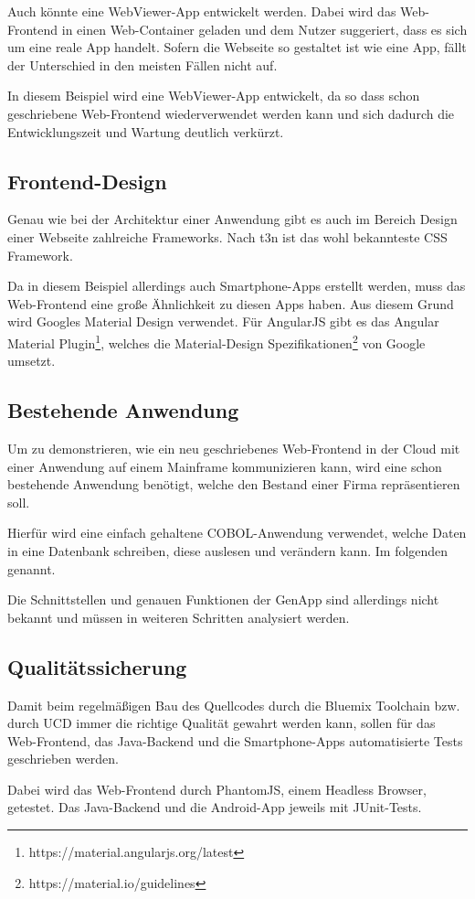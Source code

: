 Auch könnte eine WebViewer-App entwickelt werden. Dabei wird das Web-Frontend in einen Web-Container geladen und dem
Nutzer suggeriert, dass es sich um eine reale App handelt. Sofern die Webseite so gestaltet ist wie eine App, fällt der
Unterschied in den meisten Fällen nicht auf.

In diesem Beispiel wird eine WebViewer-App entwickelt, da so dass schon geschriebene Web-Frontend wiederverwendet werden
kann und sich dadurch die Entwicklungszeit und Wartung deutlich verkürzt.

\subsection{Frontend-Design}
Genau wie bei der Architektur einer Anwendung gibt es auch im Bereich Design einer Webseite zahlreiche Frameworks. Nach
t3n \cite{online_prototypischeanwendung_cssframework} ist  das wohl bekannteste CSS Framework.

Da in diesem Beispiel allerdings auch Smartphone-Apps erstellt werden, muss das Web-Frontend eine große Ähnlichkeit zu
diesen Apps haben. Aus diesem Grund wird Googles Material Design verwendet. Für AngularJS gibt es das Angular
Material Plugin\footnote{https://material.angularjs.org/latest}, welches die Material-Design
Spezifikationen\footnote{https://material.io/guidelines} von Google umsetzt.

\subsection{Bestehende Anwendung}
Um zu demonstrieren, wie ein neu geschriebenes Web-Frontend in der Cloud mit einer Anwendung auf einem Mainframe
kommunizieren kann, wird eine schon bestehende Anwendung benötigt, welche den Bestand einer Firma repräsentieren soll.

Hierfür wird eine einfach gehaltene COBOL-Anwendung verwendet, welche Daten in eine Datenbank schreiben, diese auslesen
und verändern kann. Im folgenden  genannt.

Die Schnittstellen und genauen Funktionen der GenApp sind allerdings nicht bekannt und müssen in weiteren Schritten
analysiert werden.

\subsection{Qualitätssicherung}
Damit beim regelmäßigen Bau des Quellcodes durch die Bluemix Toolchain bzw. durch UCD immer die richtige Qualität gewahrt
werden kann, sollen für das Web-Frontend, das Java-Backend und die Smartphone-Apps automatisierte Tests geschrieben werden.

Dabei wird das Web-Frontend durch PhantomJS, einem Headless Browser, getestet. Das Java-Backend und die Android-App jeweils
mit JUnit-Tests.